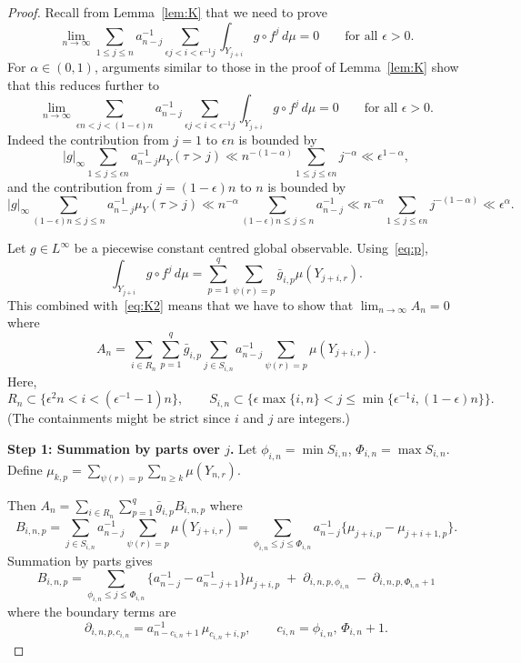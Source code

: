 \documentclass[10pt,a4paper]{amsart}
\newcommand{\eps}{\epsilon}
\begin{document}
\begin{proof} 
Recall from Lemma~\ref{lem:K} that we need to prove
\[
\lim_{n\to\infty}\sum_{1\le j\le n} a_{n-j}^{-1} 
\sum_{\eps j < i < \eps^{-1}j}\int_{Y_{j+i}}g\circ f^j\,d\mu=0
\qquad\text{for all $\eps>0$}.
\]
For $\alpha\in(0,1)$, arguments similar to those in the proof of Lemma~\ref{lem:K} show that this reduces further to
\begin{equation} \label{eq:K2}
\lim_{n\to\infty}\sum_{\eps n< j< (1-\eps) n}
a_{n-j}^{-1} \sum_{\eps j < i < \eps^{-1}j}\int_{Y_{j+i}}g\circ f^j\,d\mu=0
\qquad\text{for all $\eps>0$}.
\end{equation} 
Indeed the contribution from $j=1$ to $\eps n$ is bounded by
\[
|g|_\infty\sum_{1\le j\le \eps n}
a_{n-j}^{-1} \mu_Y(\tau>j)
\ll n^{-(1-\alpha)}\sum_{1\le j\le \eps n}j^{-\alpha}
\ll \eps^{1-\alpha},
\]
and the contribution from $j=(1-\eps)n$ to $n$ is bounded by
\[
|g|_\infty\sum_{(1-\eps)n\le j\le n}
a_{n-j}^{-1} \mu_Y(\tau>j)
\ll n^{-\alpha} \sum_{(1-\eps)n\le j\le n}a_{n-j}^{-1}
\ll n^{-\alpha} \sum_{1\le j\le \eps n} j^{-(1 - \alpha)}
\ll \eps^{\alpha}.
\]

Let $g\in L^\infty$ be a piecewise constant centred global observable.
Using~\eqref{eq:p},
\[
\int_{Y_{j+i}}g\circ f^j\,d\mu=\sum_{p=1}^q\sum_{\psi(r)=p}\bar g_{i,p} \mu(Y_{j+i,r}).
\]
This combined with~\eqref{eq:K2} means that we have to show that $\lim_{n\to\infty} A_n=0$ where
\[
A_n=
\sum_{i\in R_n} \sum_{p=1}^q\bar g_{i,p}
\sum_{j\in S_{i,n}}
a_{n-j}^{-1}\sum_{\psi(r)=p}\mu(Y_{j+i,r}).
\]
Here, 
\[
R_n\subset\big\{\eps^2 n< i<(\eps^{-1}-1)n\big\}, \qquad
S_{i,n}\subset\big\{\eps \max\{i,n\}<j \le \min\{\eps^{-1}i, (1-\eps)n\}\big\}.
\]
(The containments might be strict since $i$ and $j$ are integers.)

\vspace{1ex} \noindent
\textbf{Step 1: Summation by parts over $j$.}
Let $\phi_{i,n}=\min S_{i,n}$, $\Phi_{i,n}=\max S_{i,n}$. 
Define
$\mu_{k,p}=\sum_{\psi(r)=p}\sum_{n\ge k}\mu(Y_{n,r})$.

Then
$A_n=
\sum_{i\in R_n}\sum_{p=1}^q\bar g_{i,p} B_{i,n,p}$ where
\[
B_{i,n,p}  = \sum_{j\in S_{i,n}} a_{n-j}^{-1}\sum_{\psi(r)=p}\mu(Y_{j+i,r})=
\sum_{\phi_{i,n}\le j\le \Phi_{i,n}} a_{n-j}^{-1}\{\mu_{j+i,p}-\mu_{j+i+1,p}\}.
\]
Summation by parts gives
\[
B_{i,n,p}  = 
\sum_{\phi_{i,n}\le j\le \Phi_{i,n}} \{a_{n-j}^{-1}-a_{n-j+1}^{-1}\}\mu_{j+i,p}
\;+\; \partial_{i,n,p,\phi_{i,n}} \;-\; \partial_{i,n,p,\Phi_{i,n}+1}
\]
where the boundary terms are 
\[
\partial_{i,n,p,c_{i,n}}=a_{n-c_{i,n}+1}^{-1}\,\mu_{c_{i,n}+i,p},
\qquad c_{i,n}=\phi_{i,n},\,\Phi_{i,n}+1.
\]


\end{proof}
\end{document}
